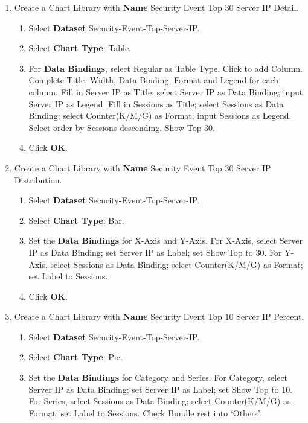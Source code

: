\begin{description}
\begin{enumerate}
\begin{enumerate}
            \item 	Click \textbf{OK}.
        \end{enumerate}
        \item Create a Chart Library with \textbf{Name} Security Event Top 30 Server IP Detail.
        \begin{enumerate}
            \item 	Select \textbf{Dataset} Security-Event-Top-Server-IP.
            \item 	Select \textbf{Chart Type}: Table.
            \item 	For \textbf{Data Bindings}, select Regular as Table Type. Click to add Column. Complete Title, Width, Data Binding, Format and Legend for each column. Fill in Server IP as Title; select Server IP as Data Binding; input Server IP as Legend. Fill in Sessions as Title; select Sessions as Data Binding; select Counter(K/M/G) as Format; input Sessions as Legend. Select order by Sessions descending. Show Top 30.
            \item 	Click \textbf{OK}.
        \end{enumerate}
        \item Create a Chart Library with \textbf{Name} Security Event Top 30 Server IP Distribution.
        \begin{enumerate}
            \item 	Select \textbf{Dataset} Security-Event-Top-Server-IP.
            \item 	Select \textbf{Chart Type}: Bar.
            \item 	Set the \textbf{Data Bindings} for X-Axis and Y-Axis. For X-Axis, select Server IP as Data Binding; set Server IP as Label; set Show Top to 30. For Y-Axis, select Sessions as Data Binding; select Counter(K/M/G) as Format; set Label to Sessions.
            \item 	Click \textbf{OK}.
        \end{enumerate}
        \item Create a Chart Library with \textbf{Name} Security Event Top 10 Server IP Percent.
        \begin{enumerate}
            \item 	Select \textbf{Dataset} Security-Event-Top-Server-IP.
            \item 	Select \textbf{Chart Type}: Pie.
            \item 	Set the \textbf{Data Bindings} for Category and Series. For Category, select Server IP as Data Binding; set Server IP as Label; set Show Top to 10. For Series, select Sessions as Data Binding; select Counter(K/M/G) as Format; set Label to Sessions. Check Bundle rest into ‘Others’.

\end{enumerate}
\end{enumerate}
\end{description}
